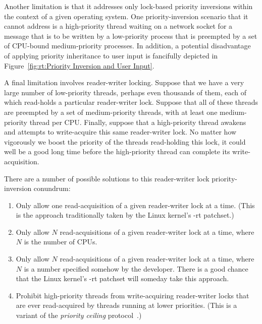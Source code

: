 Another limitation is that it addresses only lock-based priority
inversions within the context of a given operating system.
One priority-inversion scenario that it cannot address is a high-priority
thread waiting on a network socket for a message that is to be written
by a low-priority process that is preempted by a set of CPU-bound
medium-priority processes.
In addition, a potential disadvantage of applying priority inheritance
to user input is fancifully depicted in
Figure~\ref{fig:rt:Priority Inversion and User Input}.

A final limitation involves reader-writer locking.
Suppose that we have a very large number of low-priority threads, perhaps
even thousands of them, each
of which read-holds a particular reader-writer lock.
Suppose that all of these threads are preempted by a set of medium-priority
threads, with at least one medium-priority thread per CPU.
Finally, suppose that a high-priority thread awakens and attempts to
write-acquire this same reader-writer lock.
No matter how vigorously we boost the priority of the threads read-holding
this lock, it could well be a good long time before the high-priority
thread can complete its write-acquisition.

There are a number of possible solutions to this reader-writer lock
priority-inversion conundrum:

\begin{enumerate}
\item	Only allow one read-acquisition of a given reader-writer lock
	at a time.  (This is the approach traditionally taken by
	the Linux kernel's -rt patchset.)
\item	Only allow $N$ read-acquisitions of a given reader-writer lock
	at a time, where $N$ is the number of CPUs.
\item	Only allow $N$ read-acquisitions of a given reader-writer lock
	at a time, where $N$ is a number specified somehow by the
	developer.
	There is a good chance that the Linux kernel's -rt patchset
	will someday take this approach.
\item	Prohibit high-priority threads from write-acquiring reader-writer
	locks that are ever read-acquired by threads running at lower
	priorities.
	(This is a variant of the \emph{priority ceiling}
	protocol~\cite{LuiSha1990PriorityInheritance}.)
\end{enumerate}

